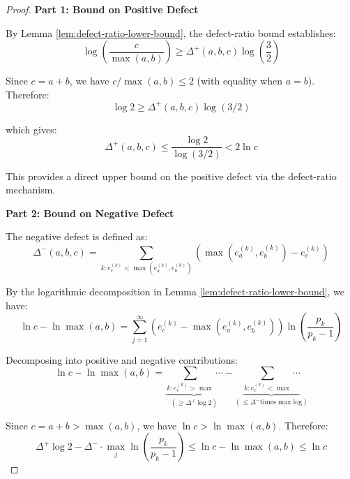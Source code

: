 \begin{proof}

\noindent \textbf{Part 1: Bound on Positive Defect}

By Lemma \ref{lem:defect-ratio-lower-bound}, the defect-ratio bound establishes:
\begin{equation}
\log\left(\frac{c}{\max(a,b)}\right) \geq \Delta^{+}(a,b,c) \log\left(\frac{3}{2}\right)
\end{equation}

Since $c = a + b$, we have $c / \max(a,b) \leq 2$ (with equality when $a = b$). Therefore:
\begin{equation}
\log 2 \geq \Delta^{+}(a,b,c) \log(3/2)
\end{equation}

which gives:
\begin{equation}
\Delta^{+}(a,b,c) \leq \frac{\log 2}{\log(3/2)} < 2 \ln c
\end{equation}

This provides a direct upper bound on the positive defect via the defect-ratio mechanism.

\noindent \textbf{Part 2: Bound on Negative Defect}

The negative defect is defined as:
\begin{equation}
\Delta^{-}(a,b,c) = \sum_{k: e_c^{(k)} < \max(e_a^{(k)}, e_b^{(k)})} (\max(e_a^{(k)}, e_b^{(k)}) - e_c^{(k)})
\end{equation}

By the logarithmic decomposition in Lemma \ref{lem:defect-ratio-lower-bound}, we have:
\begin{equation}
\ln c - \ln \max(a,b) = \sum_{j=1}^{\infty} (e_c^{(k)} - \max(e_a^{(k)}, e_b^{(k)})) \ln\left(\frac{p_k}{p_k - 1}\right)
\end{equation}

Decomposing into positive and negative contributions:
\begin{equation}
\ln c - \ln \max(a,b) = \underbrace{\sum_{k: e_c^{(k)} > \max} \cdots}_{(\geq \Delta^{+} \log 2)} - \underbrace{\sum_{k: e_c^{(k)} < \max} \cdots}_{(\leq \Delta^{-} \text{times max log})}
\end{equation}

Since $c = a + b > \max(a,b)$, we have $\ln c > \ln \max(a,b)$. Therefore:
\begin{equation}
\Delta^{+} \log 2 - \Delta^{-} \cdot \max_j \ln\left(\frac{p_k}{p_k - 1}\right) \leq \ln c - \ln \max(a,b) \leq \ln c
\end{equation}


\end{proof}
